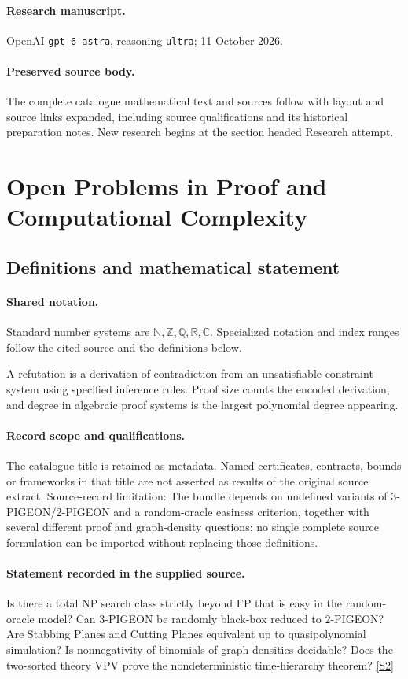 \documentclass[11pt]{article}
\begin{document}
\paragraph{Research manuscript.} OpenAI \texttt{gpt-6-astra}, reasoning \texttt{ultra}; 11 October 2026.
\paragraph{Preserved source body.} The complete catalogue mathematical text and sources follow with layout and source links expanded, including source qualifications and its historical preparation notes. New research begins at the section headed Research attempt.

\section{Open Problems in Proof and Computational Complexity}\label{statement}

\subsection{Definitions and mathematical statement}

\paragraph{Shared notation.}Standard number systems are $\mathbb N,\mathbb Z,\mathbb Q,\mathbb R,\mathbb C$. Specialized notation and index ranges follow the cited source and the definitions below.


A refutation is a derivation of contradiction from an unsatisfiable constraint system using specified inference rules. Proof size counts the encoded derivation, and degree in algebraic proof systems is the largest polynomial degree appearing.
\paragraph{Record scope and qualifications.}
The catalogue title is retained as metadata. Named certificates, contracts, bounds or frameworks in that title are not asserted as results of the original source extract.
Source-record limitation: The bundle depends on undefined variants of 3-PIGEON/2-PIGEON and a random-oracle easiness criterion, together with several different proof and graph-density questions; no single complete source formulation can be imported without replacing those definitions.
\paragraph{Statement recorded in the supplied source.}
Is there a total NP search class strictly beyond $\mathrm{FP}$ that is easy in the random-oracle model? Can $3$-PIGEON be randomly black-box reduced to $2$-PIGEON? Are Stabbing Planes and Cutting Planes equivalent up to quasipolynomial simulation? Is nonnegativity of binomials of graph densities decidable? Does the two-sorted theory $\mathrm{VPV}$ prove the nondeterministic time-hierarchy theorem? \href{https://doi.org/10.4171/owr/2024/15}{[S2]}
\end{document}
